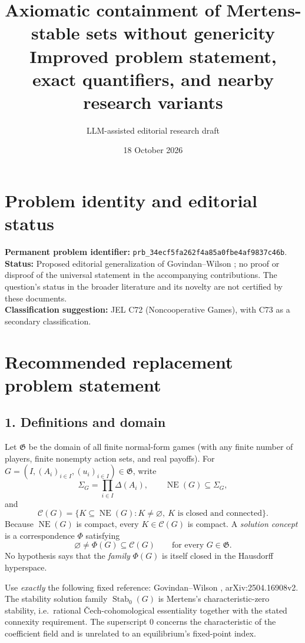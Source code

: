 \documentclass[11pt]{article}
\title{Axiomatic containment of Mertens-stable sets without genericity\\
\large Improved problem statement, exact quantifiers, and nearby research variants}
\author{LLM-assisted editorial research draft}
\date{18 October 2026}
\newcommand{\NE}{\operatorname{NE}}
\newcommand{\Stab}{\operatorname{Stab}_0}
\newcommand{\CC}{\mathcal C}
\begin{document}
\maketitle
\section*{Problem identity and editorial status}
\noindent\textbf{Permanent problem identifier:} \texttt{prb\_34ecf5fa262f4a85a0fbe4af9837c46b}.\\
\textbf{Status:} Proposed editorial generalization of Govindan--Wilson
\cite{gw}; no proof or disproof of the universal statement in the
accompanying contributions. The question's status in the broader literature
and its novelty are not certified by these documents.\\
\textbf{Classification suggestion:} JEL C72 (Noncooperative Games), with C73
as a secondary classification.

\section*{Recommended replacement problem statement}
\subsection*{1. Definitions and domain}
Let $\mathfrak G$ be the domain of all finite normal-form games (with
any finite number of players, finite nonempty action sets, and real payoffs).
For $G=(I,(A_i)_{i\in I},(u_i)_{i\in I})\in\mathfrak G$, write
\[
 \Sigma_G=\prod_{i\in I}\Delta(A_i),\qquad
 \NE(G)\subseteq\Sigma_G,
\]
and
\[
 \CC(G)=\{K\subseteq\NE(G):K\ne\varnothing,\ 
                        K\text{ is closed and connected}\}.
\]
Because $\NE(G)$ is compact, every $K\in\CC(G)$ is compact.
A \emph{solution concept} is a correspondence $\Phi$ satisfying
\[
 \varnothing\ne\Phi(G)\subseteq\CC(G)
 \qquad\text{for every }G\in\mathfrak G.
 \tag{1}\label{eq:correspondence}
\]
No hypothesis says that the \emph{family} $\Phi(G)$ is itself closed
in the Hausdorff hyperspace.

Use \emph{exactly} the following fixed reference: Govindan--Wilson
\cite[Definition 2.4; Axioms 3.1, 4.7, 5.4]{gw}, arXiv:2504.16908v2.
The stability solution family $\Stab(G)$ is Mertens's
characteristic-zero stability, i.e.\ rational \v Cech-cohomological
essentiality together with the stated connexity requirement.
The superscript $0$ concerns the characteristic of the coefficient
field and is unrelated to an equilibrium's fixed-point index.
\end{document}
